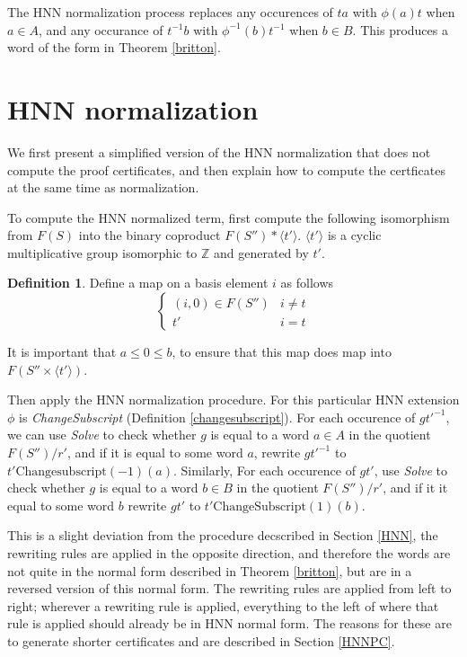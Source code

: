 \documentclass[11pt]{article} %
\theoremstyle{definition}
\theoremstyle{definition}
\theoremstyle{definition}
\theoremstyle{definition}
\theoremstyle{definition}
\newtheorem{defn}[theorem]{Definition}
\theoremstyle{definition}
\begin{document}
The HNN normalization process replaces any occurences of $ta$ with $\phi(a)t$ when $a \in A$, and
any occurance of $t^{-1}b$ with $\phi^{-1}(b)t^{-1}$ when $b \in B$. This produces a word of
the form in Theorem \ref{britton}.

\section{HNN normalization}\label{HNNnorm}

We first present a simplified version of the HNN normalization that does not compute
the proof certificates, and then explain how to compute the certficates at the same time as normalization.

To compute the HNN normalized term, first compute the following isomorphism from $F(S)$ into the binary
coproduct $F(S'') \ast \langle t' \rangle$. $\langle t' \rangle$ is a cyclic
multiplicative group isomorphic to $\mathbb{Z}$ and generated by $t'$.

\begin{defn}\label{tocoprod}
  Define a map on a basis element $i$ as follows
  \begin{equation}
    \begin{cases}
      (i, 0) \in F(S'') & i \ne t \\
      t' & i = t
    \end{cases}
  \end{equation}
\end{defn}

It is important that $a \le 0 \le b$, to ensure that this map does map into $F(S'' \times \langle t' \rangle)$.

Then apply the HNN normalization procedure. For this particular HNN extension $\phi$ is \textit{ChangeSubscript}
(Definition \ref{changesubscript}). For each occurence of
$gt'^{-1}$, we can use \textit{Solve} to check whether $g$ is equal
to a word  $a \in A$ in the quotient $F(S'') / r'$, and if it is equal to some word $a$, rewrite
$gt'^{-1}$ to $t'\text{Changesubscript}(-1)(a)$. Similarly, For each occurence of $gt'$, use \textit{Solve}
to check whether $g$ is equal to a word $b \in B$ in the quotient $F(S'') / r'$, and if it it equal to
some word $b$ rewrite $gt'$ to $t'\text{ChangeSubscript}(1)(b)$.

This is a slight deviation from the procedure decscribed in
Section \ref{HNN}, the rewriting rules are applied in the opposite direction, and therefore
the words are not quite in the normal form described in Theorem \ref{britton}, but are in a reversed
version of this normal form.  The rewriting rules are applied from left to right; wherever a rewriting rule
is applied, everything to the left of where that rule is applied should already be in
HNN normal form. The reasons for these are to generate shorter certificates and are described
in Section \ref{HNNPC}.
\end{document}
